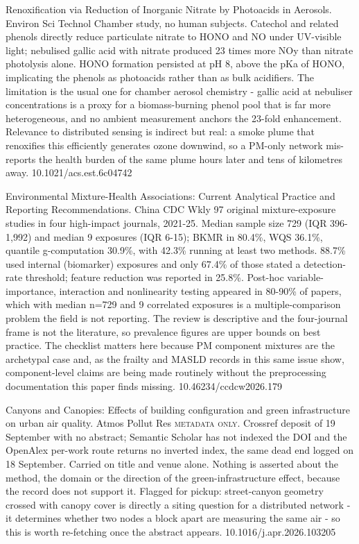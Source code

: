 \documentclass[10pt]{article}
\begin{document}
{Renoxification via Reduction of Inorganic Nitrate by Photoacids in Aerosols.}
{Environ Sci Technol}
{Chamber study, no human subjects. Catechol and related phenols directly reduce particulate nitrate to HONO and NO under UV-visible light; nebulised gallic acid with nitrate produced 23 times more NOy than nitrate photolysis alone. HONO formation persisted at pH 8, above the pKa of HONO, implicating the phenols as photoacids rather than as bulk acidifiers. The limitation is the usual one for chamber aerosol chemistry - gallic acid at nebuliser concentrations is a proxy for a biomass-burning phenol pool that is far more heterogeneous, and no ambient measurement anchors the 23-fold enhancement. Relevance to distributed sensing is indirect but real: a smoke plume that renoxifies this efficiently generates ozone downwind, so a PM-only network mis-reports the health burden of the same plume hours later and tens of kilometres away.}
{10.1021/acs.est.6c04742}

{Environmental Mixture-Health Associations: Current Analytical Practice and Reporting Recommendations.}
{China CDC Wkly}
{97 original mixture-exposure studies in four high-impact journals, 2021-25. Median sample size 729 (IQR 396-1,992) and median 9 exposures (IQR 6-15); BKMR in 80.4\%, WQS 36.1\%, quantile g-computation 30.9\%, with 42.3\% running at least two methods. 88.7\% used internal (biomarker) exposures and only 67.4\% of those stated a detection-rate threshold; feature reduction was reported in 25.8\%. Post-hoc variable-importance, interaction and nonlinearity testing appeared in 80-90\% of papers, which with median n=729 and 9 correlated exposures is a multiple-comparison problem the field is not reporting. The review is descriptive and the four-journal frame is not the literature, so prevalence figures are upper bounds on best practice. The checklist matters here because PM component mixtures are the archetypal case and, as the frailty and MASLD records in this same issue show, component-level claims are being made routinely without the preprocessing documentation this paper finds missing.}
{10.46234/ccdcw2026.179}

{Canyons and Canopies: Effects of building configuration and green infrastructure on urban air quality.}
{Atmos Pollut Res}
{\textsc{metadata only.} Crossref deposit of 19 September with no abstract; Semantic Scholar has not indexed the DOI and the OpenAlex per-work route returns no inverted index, the same dead end logged on 18 September. Carried on title and venue alone. Nothing is asserted about the method, the domain or the direction of the green-infrastructure effect, because the record does not support it. Flagged for pickup: street-canyon geometry crossed with canopy cover is directly a siting question for a distributed network - it determines whether two nodes a block apart are measuring the same air - so this is worth re-fetching once the abstract appears.}
{10.1016/j.apr.2026.103205}
\end{document}

